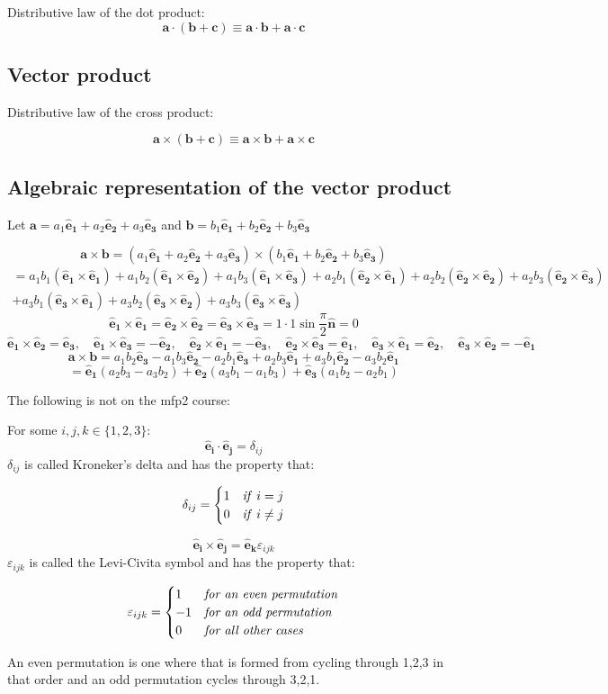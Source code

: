 \documentclass{article}
\newcommand{\vh}[1]{\vec{\hat{#1}}}
\renewcommand{\vec}[1]{\bm{#1}}
\newcommand{\vv}[1]{\vec{#1}}
\newcommand{\ve}[1]{\vec{\hat{e}_{#1}}}
\begin{document}
Distributive law of the dot product:
\[\vv a\cdot(\vv b+\vv c)\equiv\vv a\cdot\vv b+\vv a\cdot\vv c\]

\subsection*{Vector product}

Distributive law of the cross product:

\[\vv a\times(\vv b+\vv c)\equiv\vv a\times\vv b+\vv a\times\vv c\]

\subsection*{Algebraic representation of the vector product}

Let \(\vv a=a_1\ve1+a_2\ve2+a_3\ve3\) and \(\vv b=b_1\ve1+b_2\ve2+b_3\ve3\)


\[\vv a\times \vv b=(a_1\ve1+a_2\ve2+a_3\ve3)\times(b_1\ve1+b_2\ve2+b_3\ve3)\]
\begin{multline*}
=a_1b_1(\ve1\times\ve1)+a_1b_2(\ve1\times\ve2)+a_1b_3(\ve1\times\ve3)+a_2b_1(\ve2\times\ve1)+a_2b_2(\ve2\times\ve2)+a_2b_3(\ve2\times\ve3)\\+a_3b_1(\ve3\times\ve1)+a_3b_2(\ve3\times\ve2)+a_3b_3(\ve3\times\ve3)
\end{multline*}
\[\ve1\times\ve1=\ve2\times\ve2=\ve3\times\ve3=1\cdot1\sin\frac{\pi}{2}\vh n=0\]
\[\ve1\times\ve2=\ve3,\quad\ve1\times\ve3=-\ve2,\quad\ve2\times\ve1=-\ve3,\quad\ve2\times\ve3=\ve1,\quad\ve3\times\ve1=\ve2,\quad\ve3\times\ve2=-\ve1\]
\[\vv a\times\vv b=a_1b_2\ve3-a_1b_3\ve2-a_2b_1\ve3+a_2b_3\ve1+a_3b_1\ve2-a_3b_2\ve1\]
\[=\ve1(a_2b_3-a_3b_2)+\ve2(a_3b_1-a_1b_3)+\ve3(a_1b_2-a_2b_1)\]

\begin{itshape}
The following is not on the mfp2 course:

For some \(i,j,k\in\{1,2,3\}\):
\[\ve i\cdot\ve j=\delta_{ij}\]
\(\delta_{ij}\) is called Kroneker's delta and has the property that:

\[\delta_{ij}=
   \begin{cases} 
      1& \text{\emph{if} } i=j \\
      0& \text{\emph{if} } i\ne j \\
   \end{cases}\]

\[\ve i\times\ve j=\ve k\varepsilon_{ijk}\]
\(\varepsilon_{ijk}\) is called the Levi-Civita symbol and has the property that:

\[\varepsilon_{ijk}=
   \begin{cases}
      1& \text{\emph{for an even permutation}}\\
      -1& \text{\emph{for an odd permutation}}\\
      0& \text{\emph{for all other cases}}
   \end{cases}\]

An even permutation is one where that is formed from cycling through 1,2,3 in that order and an odd permutation cycles through 3,2,1.
\end{itshape}
\end{document}
